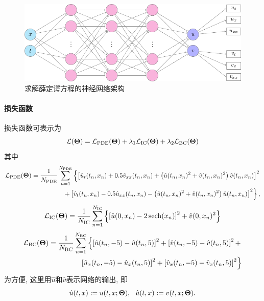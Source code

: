 \documentclass[addpoints,answers]{exam}
\DeclareMathOperator{\sech}{sech}
\begin{document}
  \begin{figure}[htbp]
    \centering
    \includegraphics[width=5in]{tikz/Net1.pdf}
    \caption{求解薛定谔方程的神经网络架构}
  \end{figure}

 \paragraph{损失函数} 损失函数可表示为
    $$
    \mathcal{L}({\boldsymbol{\Theta}}) = \mathcal{L}_{\mathrm{PDE}}({\boldsymbol{\Theta}}) + \lambda_1 \mathcal{L}_{\mathrm{IC}}({\boldsymbol{\Theta}}) + \lambda_2 \mathcal{L}_{\mathrm{BC}}({\boldsymbol{\Theta}})
    $$
    其中
    $$
    \begin{aligned}
      \mathcal{L}_{\mathrm{PDE}}({\boldsymbol{\Theta}}) = \frac1{N_{\mathrm{PDE}}} \sum_{n=1}^{N_{\mathrm{PDE}}} \left\{  \left[\hat u_t (t_n, x_n) + 0.5 \hat v_{xx}(t_n, x_n) + \left(\hat u(t_n, x_n)^2+\hat v(t_n, x_n)^2\right)\hat v(t_n, x_n) \right]^2 \right. \\
      \quad \left. + \left[\hat v_t(t_n, x_n) - 0.5 \hat u_{xx}(t_n, x_n) - \left(\hat u(t_n, x_n)^2+\hat v(t_n, x_n)^2\right)\hat u(t_n, x_n)\right]^2 \right\},
    \end{aligned}
    $$
    $$
    \begin{aligned}
      \cL_{\mathrm{IC}}(\vTheta) = \frac1{N_{\mathrm{IC}}} \sum_{n=1}^{N_{\mathrm{IC}}} \left\{\left[\hat u(0,x_n) - 2 \sech (x_n)\right]^2 + \hat v(0, x_n)^2 \right\}
    \end{aligned}
    $$
    $$
    \begin{aligned}
      \mathcal{L}_{\mathrm{BC}}({\boldsymbol{\Theta}}) = \frac1{N_{\mathrm{BC}}} \sum_{n=1}^{N_{\mathrm{BC}}} \left\{
      \left[\hat u(t_n,-5) - \hat u(t_n, 5)\right]^2 + 
      \left[\hat v(t_n,-5) - \hat v(t_n, 5)\right]^2 + \right. \\
      \quad \left. \left[\hat u_x(t_n,-5) - \hat u_x(t_n, 5)\right]^2 +
      \left[\hat v_x(t_n,-5) - \hat v_x(t_n, 5)\right]^2 
      \right\}
    \end{aligned}
    $$
    为方便, 这里用$\hat u$和$\hat v$表示网络的输出, 即
    $$
    \hat u(t, x) := u(t, x; {\boldsymbol{\Theta}}), ~~
    \hat u(t, x) := v(t, x; {\boldsymbol{\Theta}}).
    $$
\end{document}
